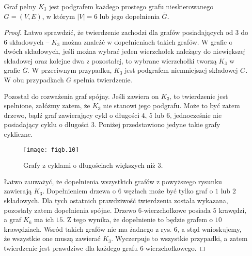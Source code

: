 \subsubsection{} %
\begin{twierdzenie*}
	Graf pełny $K_3$ jest podgrafem każdego prostego grafu nieskierowanego $G=(V,E)$, w którym $|V|=6$ lub jego dopełnienia $\overline{G}$.
\end{twierdzenie*}
\begin{proof}
Łatwo sprawdzić, że twierdzenie zachodzi dla grafów posiadających od $3$ do $6$ składowych -- $K_3$ można znaleźć w dopełnieniach takich grafów. W grafie o dwóch składowych, jeśli można wybrać jeden wierzchołek należący do niewiększej składowej oraz kolejne dwa z pozostałej, to wybrane wierzchołki tworzą $K_3$ w grafie $\overline{G}$. W przeciwnym przypadku, $K_3$ jest podgrafem niemniejszej składowej $G$. W obu przypadkach $G$ spełnia twierdzenie.

Pozostał do rozważenia graf spójny. Jeśli zawiera on $K_3$, to twierdzenie jest spełnione, załóżmy zatem, że $K_3$ nie stanowi jego podgrafu. Może to być zatem drzewo, bądź graf zawierający cykl o długości $4$, $5$ lub $6$, jednocześnie nie posiadający cyklu o długości $3$. Poniżej przedstawiono jedyne takie grafy cykliczne.
\begin{figure}[h]
	\begin{center}
		\texttt{[image: figb.10]}
	\end{center}
	\caption{Grafy z cyklami o długościach większych niż $3$.}
\end{figure}
Łatwo zauważyć, że dopełnienia wszystkich grafów z powyższego rysunku zawierają $K_3$. Dopełnieniem drzewa o $6$ węzłach może być tylko graf o $1$ lub $2$ składowych. Dla tych ostatnich prawdziwość twierdzenia została wykazana, pozostały zatem dopełnienia spójne. Drzewo $6$-wierzchołkowe posiada $5$ krawędzi, a graf $K_6$ ma ich $15$. Z tego wynika, że dopełnienie to będzie grafem o $10$ krawędziach. Wsród takich grafów nie ma żadnego z rys. 6, a stąd wnioskujemy, że wszystkie one muszą zawierać $K_3$. Wyczerpuje to wszystkie przypadki, a zatem twierdzenie jest prawdziwe dla każdego grafu $6$-wierzchołkowego.

\end{proof}

